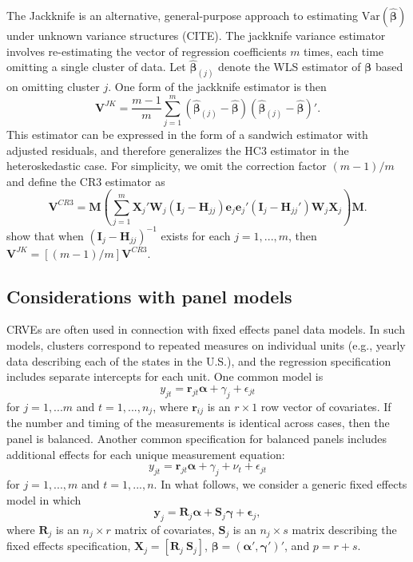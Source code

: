 \documentclass[12pt]{article}\usepackage[]{graphicx}\usepackage[]{color}
\newcommand{\Var}{\text{Var}}
\newcommand{\bm}{\mathbf}
\newcommand{\bs}{\boldsymbol}
\begin{document}
The Jackknife is an alternative, general-purpose approach to estimating $\Var\left(\bs{\hat\beta}\right)$ under unknown variance structures (CITE). 
The jackknife variance estimator involves re-estimating the vector of regression coefficients $m$ times, each time omitting a single cluster of data. 
Let $\bs{\hat\beta}_{(j)}$ denote the WLS estimator of $\bs\beta$ based on omitting cluster $j$. 
One form of the jackknife estimator is then 
\begin{equation}
\label{eq:V_JK}
\bm{V}^{JK} = \frac{m - 1}{m} \sum_{j=1}^m \left(\bs{\hat\beta}_{(j)} - \bs{\hat\beta}\right) \left(\bs{\hat\beta}_{(j)} - \bs{\hat\beta}\right)'.
\end{equation}
This estimator can be expressed in the form of a sandwich estimator with adjusted residuals, and therefore generalizes the HC3 estimator in the heteroskedastic case. 
For simplicity, we omit the correction factor $(m - 1) / m$ and define the CR3 estimator as \[
\bm{V}^{CR3} = \bm{M}\left(\sum_{j=1}^m \bm{X}_j'\bm{W}_j \left(\bm{I}_j - \bm{H}_{jj}\right)\bm{e}_j \bm{e}_j' \left(\bm{I}_j - \bm{H}_{jj}'\right) \bm{W}_j \bm{X}_j\right) \bm{M}. \]
\citet{Bell2002bias} show that when $\left(\bm{I}_j - \bm{H}_{jj}\right)^{-1}$ exists for each $j = 1,...,m$, then $\bm{V}^{JK} = [(m - 1) / m] \bm{V}^{CR3}$.  

\subsection{Considerations with panel models}

CRVEs are often used in connection with fixed effects panel data models. 
In such models, clusters correspond to repeated measures on individual units (e.g., yearly data describing each of the states in the U.S.), and the regression specification includes separate intercepts for each unit.
One common model is 
\[
y_{jt} = \bm{r}_{jt} \bs\alpha + \gamma_j + \epsilon_{jt} \]
for $j=1,...m$ and $t = 1,...,n_j$, where $\bm{r}_{ij}$ is an $r \times 1$ row vector of covariates. If the number and timing of the measurements is identical across cases, then the panel is balanced. Another common specification for balanced panels includes additional effects for each unique measurement equation:
\[
y_{jt} = \bm{r}_{jt} \bs\alpha + \gamma_j + \nu_t + \epsilon_{jt} \]
for $j=1,...,m$ and $t = 1,...,n$. 
In what follows, we consider a generic fixed effects model in which
\begin{equation}
\label{eq:fixed_effects}
\bm{y}_j = \bm{R}_j \bs\alpha + \bm{S}_j \bs\gamma + \bs\epsilon_j,
\end{equation}
where $\bm{R}_j$ is an $n_j \times r$ matrix of covariates, $\bm{S}_j$ is an $n_j \times s$ matrix describing the fixed effects specification, $\bm{X}_j = \left[\bm{R}_j \ \bm{S}_j\right]$, $\bs\beta = \left(\bs\alpha', \bs\gamma'\right)'$, and $p = r + s$. 
\end{document}
